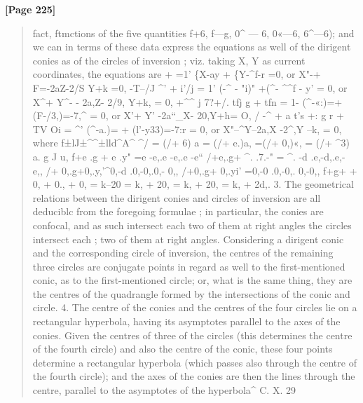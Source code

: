 \documentclass[11pt,a4paper]{book}
\begin{document}
\textbf{[Page 225]}\\[0.2cm]
\begin{quote}
fact, ftmctions of the five quantities f+6, f---g, 0\textasciicircum{} --- 6, 0«---6, 6\textasciicircum{}---6); and we can
in terms of these data express the equations as well of the dirigent conies as of
the circles of inversion ; viz. taking X, Y as current coordinates, the equations are
+ =1' \{X-ay + \{Y-\textasciicircum{}f-r =0, or X"-+ F=-2aZ-2/S Y+k =0,
-T--/J
\textasciicircum{}' + i'/j = 1' (-\textasciicircum{} - "i)" +(\textasciicircum{}- \textasciicircum{}\textasciicircum{}f - y' = 0, or X\textasciicircum{}+ Y\textasciicircum{}- - 2a,Z- 2/9, Y+k, = 0,
+\textasciicircum{}\textasciicircum{}
j 7?+/. tfj g + tfn = 1- (\textasciicircum{}-«:)=+(F-/3,)=-7,\textasciicircum{} = 0, or X'+ Y' -2a``\_X- 20,Y+h= O,
/ -\textasciicircum{} + a t's +: g r + TV Oi = \textasciicircum{}' (\textasciicircum{}-a.)= + (l'-y33)=-7:r = 0, or X"--\textasciicircum{}Y--2a,X -2\textasciicircum{},Y --k, = 0,
where
f±lJ±\textasciicircum{}\textasciicircum{}±lld\textasciicircum{}A\textasciicircum{}
\textasciicircum{}/ = (/+ 6) a = (/+ e.)a, =(/+ 0,)«, = (/+ \textasciicircum{}3) a.
g J
u,
f+e .g + e .y" =e -e,.e -e,.e -e``
/+e,.g+ \textasciicircum{}. .7.-" = \textasciicircum{}. -d .e,-d,.e,- e,,
/+ 0,.g+0,.y,'\textasciicircum{}0,-d .0,-0,.0,-
0,,
/+0,.g+ 0,.yi' =0,-0 .0,-0,. 0,-0,,
f+g+ + 0, + 0., + 0, = k--20 = k, + 20, = k, + 20, = k, + 2d,.
3. The geometrical relations between the dirigent conies and circles of inversion
are all deduciblc from the foregoing formulae ; in particular, the conies are confocal,
and as such intersect each two of them at right angles the circles intersect each
;
two of them at right angles. Considering a dirigent conic and the corresponding
circle of inversion, the centres of the remaining three circles are conjugate points in
regard as well to the first-mentioned conic, as to the first-mentioned circle; or,
what is the same thing, they are the centres of the quadrangle formed by the
intersections of the conic and circle.
4. The centre of the conies and the centres of the four circles lie on a
rectangular hyperbola, having its asymptotes parallel to the axes of the conies. Given
the centres of three of the circles (this determines the centre of the fourth circle)
and also the centre of the conic, these four points determine a rectangular hyperbola
(which passes also through the centre of the fourth circle); and the axes of the
conies are then the lines through the centre, parallel to the asymptotes of the
hyperbola\textasciicircum{}
C. X. 29
\end{quote}
\end{document}
